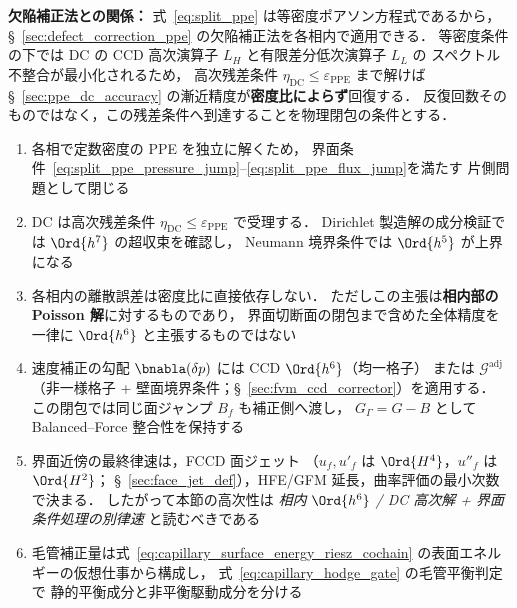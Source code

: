\noindent\textbf{欠陥補正法との関係：}
式~\eqref{eq:split_ppe} は等密度ポアソン方程式であるから，
§~\ref{sec:defect_correction_ppe} の欠陥補正法を各相内で適用できる．
等密度条件の下では DC の CCD 高次演算子 $L_H$ と有限差分低次演算子 $L_L$ の
スペクトル不整合が最小化されるため，
高次残差条件 $\eta_{\mathrm{DC}}\le\varepsilon_{\mathrm{PPE}}$ まで解けば
§~\ref{sec:ppe_dc_accuracy} の漸近精度が\textbf{密度比によらず}回復する．
反復回数そのものではなく，この残差条件へ到達することを物理閉包の条件とする．

\begin{tcolorbox}[resultbox, title={分相 PPE + DC 残差受理条件の相内精度と界面律速}]
\begin{enumerate}[noitemsep]
  \item 各相で定数密度の PPE を独立に解くため，
        界面条件~\eqref{eq:split_ppe_pressure_jump}--\eqref{eq:split_ppe_flux_jump}を満たす
        片側問題として閉じる
  \item DC は高次残差条件
        $\eta_{\mathrm{DC}}\le\varepsilon_{\mathrm{PPE}}$ で受理する．
        Dirichlet 製造解の成分検証では $\Ord{h^7}$ の超収束を確認し，
        Neumann 境界条件では $\Ord{h^5}$ が上界になる
  \item 各相内の離散誤差は密度比に直接依存しない．
        ただしこの主張は\textbf{相内部の Poisson 解}に対するものであり，
        界面切断面の閉包まで含めた全体精度を一律に $\Ord{h^6}$ と主張するものではない
  \item 速度補正の勾配 $\bnabla(\delta p)$ には CCD $\Ord{h^6}$（均一格子）
        または $\mathcal{G}^\text{adj}$（非一様格子 + 壁面境界条件；§~\ref{sec:fvm_ccd_corrector}）を適用する．
        この閉包では同じ面ジャンプ $B_f$ も補正側へ渡し，
        $G_\Gamma=G-B$ として Balanced--Force 整合性を保持する
  \item 界面近傍の最終律速は，FCCD 面ジェット
        （$u_f,u'_f$ は $\Ord{H^4}$，$u''_f$ は $\Ord{H^2}$；
        §~\ref{sec:face_jet_def}），HFE/GFM 延長，曲率評価の最小次数で決まる．
        したがって本節の高次性は
        \emph{相内 $\Ord{h^6}$ / DC 高次解 + 界面条件処理の別律速}
        と読むべきである
  \item 毛管補正量は式~\eqref{eq:capillary_surface_energy_riesz_cochain}
        の表面エネルギーの仮想仕事から構成し，
        式~\eqref{eq:capillary_hodge_gate} の毛管平衡判定で
        静的平衡成分と非平衡駆動成分を分ける
\end{enumerate}
\end{tcolorbox}

